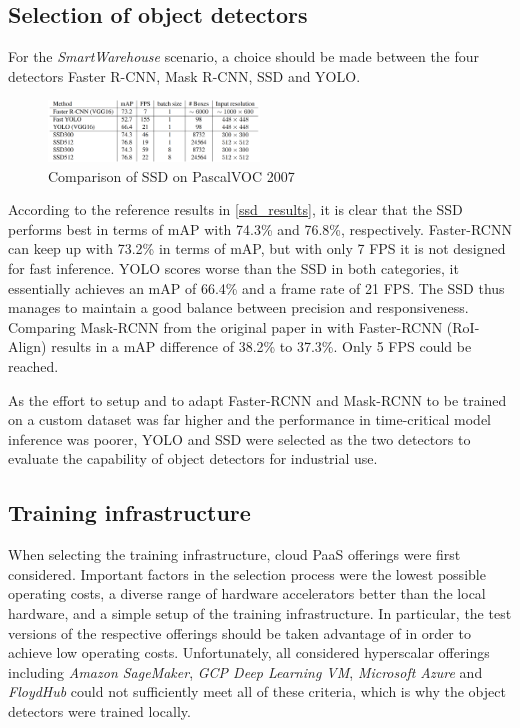\documentclass[a4paper, 10pt, journal]{wissarbIEEE}      %
\begin{document}
\subsection{Selection of object detectors}

For the \textit{SmartWarehouse} scenario, a choice should be made between the four detectors Faster R-CNN, Mask R-CNN, SSD and YOLO. 

\begin{figure}[h]
	\centering
	\includegraphics[width=0.5\textwidth]{fig/ssd_results.png}
	\caption{Comparison of SSD on PascalVOC 2007 \cite{WeiLiuDragomirAnguelovDumitruErhanChristianSzegedyScottReedChengYangFuAlexander.2016}}
	\label{ssd_results}
\end{figure}

According to the reference results in \autoref{ssd_results}, it is clear that the SSD performs best in terms of mAP with 74.3\% and 76.8\%, respectively. Faster-RCNN can keep up with 73.2\% in terms of mAP, but with only 7 FPS it is not designed for fast inference. YOLO scores worse than the SSD in both categories, it essentially achieves an mAP of 66.4\% and a frame rate of 21 FPS. The SSD thus manages to maintain a good balance between precision and responsiveness. Comparing Mask-RCNN from the original paper in \cite{KaimingHeGeorgiaGkioxariPiotrDollarRossGirshick.2018} with Faster-RCNN (RoI-Align) results in a mAP difference of 38.2\% to 37.3\%. Only 5 FPS could be reached. 

As the effort to setup and to adapt Faster-RCNN and Mask-RCNN to be trained on a custom dataset was far higher and the performance in time-critical model inference was poorer, YOLO and SSD were selected as the two detectors to evaluate the capability of object detectors for industrial use.

\subsection{Training infrastructure}

When selecting the training infrastructure, cloud PaaS offerings were first considered. Important factors in the selection process were the lowest possible operating costs, a diverse range of hardware accelerators better than the local hardware, and a simple setup of the training infrastructure. In particular, the test versions of the respective offerings should be taken advantage of in order to achieve low operating costs. Unfortunately, all considered hyperscalar offerings including \textit{Amazon SageMaker}, \textit{GCP Deep Learning VM}, \textit{Microsoft Azure} and \textit{FloydHub} could not sufficiently meet all of these criteria, which is why the object detectors were trained locally. 
\end{document}
